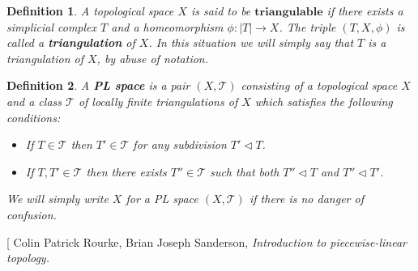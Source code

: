\documentclass[11pt]{book}
\newtheorem{definition}{Definition}
\begin{document}
\begin{definition}
A topological space $X$ is said to be $\mathbf{triangulable}$ if there exists a simplicial complex $T$ and a homeomorphism $\phi : |T| \to X$. The triple $(T,X, \phi)$ is called a \textbf{triangulation} of $X$. In this situation we will simply say that $T$ is a triangulation of $X$, by abuse of notation.
\end{definition}


\begin{definition}
A \textbf{PL space} is a pair $(X,\mathcal{T})$ consisting of a topological space $X$ and a class $\mathcal{T}$ of locally finite triangulations of $X$ which satisfies the following conditions:
\begin{itemize}
\item If $T \in \mathcal{T}$ then $T' \in \mathcal{T}$ for any subdivision $T' \lhd T$.
\item If $T,T' \in \mathcal{T}$ then there exists $T'' \in \mathcal{T}$ such that both $T'' \lhd T$ and $T'' \lhd T'$.
\end{itemize}
We will simply write $X$ for a PL space $(X,\mathcal{T})$ if there is no danger of confusion.

\end{definition}


\begin{thebibliography}[
Colin Patrick Rourke, Brian Joseph Sanderson, \textit{Introduction to piecewise-linear topology.}
\end{thebibliography}
\end{document}
